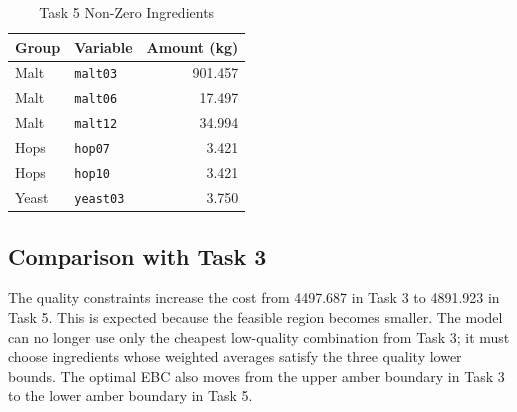 \begin{table}[!t]
\renewcommand{\arraystretch}{1.15}
\caption{Task 5 Non-Zero Ingredients}
\label{tab:task35-ingredients}
\centering
\small
\begin{tabular}{@{}llr@{}}
\toprule
Group & Variable & Amount (kg) \\
\midrule
Malt & \texttt{malt03} & 901.457 \\
Malt & \texttt{malt06} & 17.497 \\
Malt & \texttt{malt12} & 34.994 \\
Hops & \texttt{hop07} & 3.421 \\
Hops & \texttt{hop10} & 3.421 \\
Yeast & \texttt{yeast03} & 3.750 \\
\bottomrule
\end{tabular}
\end{table}

\subsection{Comparison with Task 3}
\label{sec:task5-comparison}
The quality constraints increase the cost from 4497.687 in Task 3 to 4891.923 in Task 5. This is expected because the feasible region becomes smaller. The model can no longer use only the cheapest low-quality combination from Task 3; it must choose ingredients whose weighted averages satisfy the three quality lower bounds. The optimal EBC also moves from the upper amber boundary in Task 3 to the lower amber boundary in Task 5.

